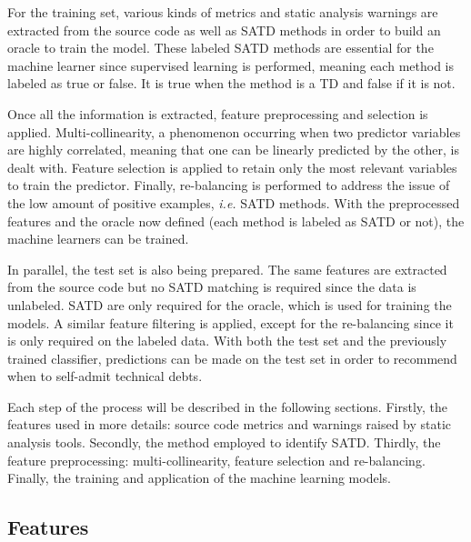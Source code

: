 For the training set, various kinds of metrics and static analysis warnings are extracted from the source code as well as \ac{SATD} methods in order to build an oracle to train the model. These labeled \ac{SATD} methods are essential for the machine learner since supervised learning is performed, meaning each method is labeled as true or false. It is true when the method is a \ac{TD} and false if it is not. \par 

Once all the information is extracted, feature preprocessing and selection is applied. Multi-collinearity, a phenomenon occurring when two predictor variables are highly correlated, meaning that one can be linearly predicted by the other, is dealt with. Feature selection is applied to retain only the most relevant variables to train the predictor. Finally, re-balancing is performed to address the issue of the low amount of positive examples, \textit{i.e.} \ac{SATD} methods. With the preprocessed features and the oracle now defined (each method is labeled as \ac{SATD} or not), the machine learners can be trained. \par 

In parallel, the test set is also being prepared. The same features are extracted from the source code but no \ac{SATD} matching is required since the data is unlabeled. \ac{SATD} are only required for the oracle, which is used for training the models. A similar feature filtering is applied, except for the re-balancing since it is only required on the labeled data. With both the test set and the previously trained classifier, predictions can be made on the test set in order to recommend when to self-admit technical debts. \par

Each step of the process will be described in the following sections. Firstly, the features used in more details: source code metrics and warnings raised by static analysis tools. Secondly, the method employed to identify \ac{SATD}. Thirdly, the feature preprocessing: multi-collinearity, feature selection and re-balancing. Finally, the training and application of the machine learning models.

\subsection{Features}


